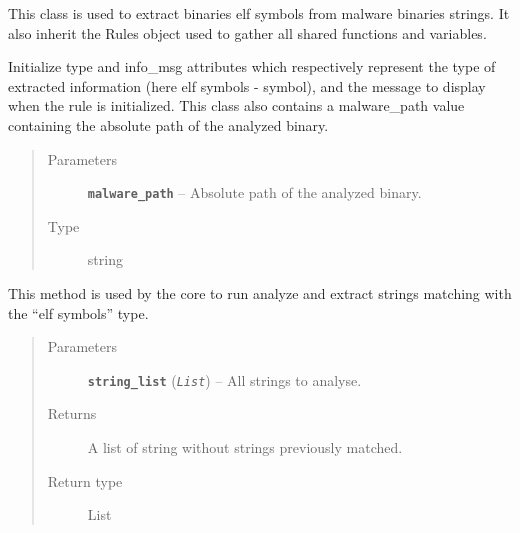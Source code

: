 \documentclass[letterpaper,10pt,oneside]{sphinxmanual}
\begin{document}
\begin{fulllineitems}
\label{index:lib.allRules.symbol.Symbol}
This class is used to extract binaries elf symbols from malware
binaries strings. It also inherit the Rules object used to gather
all shared functions and variables.

\begin{fulllineitems}
\label{index:lib.allRules.symbol.Symbol.__init__}
Initialize type and info\_msg attributes which respectively represent
the type of extracted information (here elf symbols - symbol),
and the message to display when the rule is initialized.
This class also contains a malware\_path value containing the absolute
path of the analyzed binary.
\begin{quote}\begin{description}
\item[{Parameters}] \leavevmode
\textbf{\texttt{malware\_path}} -- Absolute path of the analyzed binary.

\item[{Type}] \leavevmode
string

\end{description}\end{quote}

\end{fulllineitems}


\begin{fulllineitems}
\label{index:lib.allRules.symbol.Symbol.run_analysis}
This method is used by the core to run analyze and extract strings
matching with the ``elf symbols'' type.
\begin{quote}\begin{description}
\item[{Parameters}] \leavevmode
\textbf{\texttt{string\_list}} (\emph{\texttt{List}}) -- All strings to analyse.

\item[{Returns}] \leavevmode
A list of string without strings previously matched.

\item[{Return type}] \leavevmode
List

\end{description}\end{quote}

\end{fulllineitems}


\end{fulllineitems}
\end{document}
